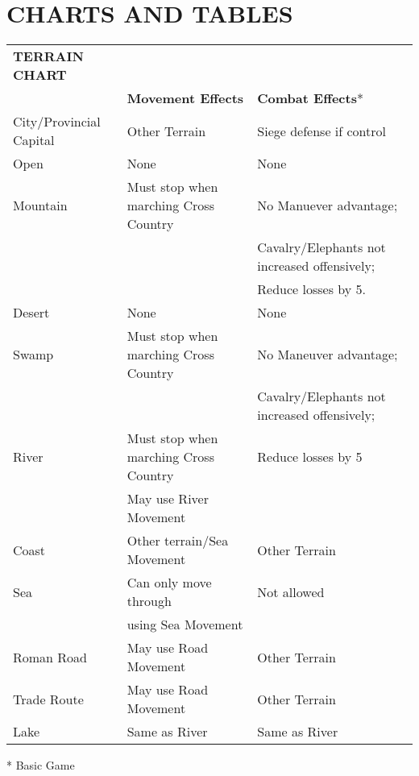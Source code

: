 \section{CHARTS AND TABLES}

\begin{tabular}{|lll|}
  \hline
  \textbf{TERRAIN CHART} & &\\
  & \textbf{Movement Effects} & \textbf{Combat Effects}*\\
  City/Provincial Capital & Other Terrain & Siege defense if control\\
  Open & None & None\\
  Mountain & Must stop when marching Cross Country & No Manuever advantage;\\
  & & Cavalry/Elephants not increased offensively;\\
  & & Reduce losses by 5.\\
  Desert & None & None\\
  Swamp & Must stop when marching Cross Country & No Maneuver advantage;\\
  & & Cavalry/Elephants not increased offensively;\\
  River & Must stop when marching Cross Country & Reduce losses by 5\\
  & May use River Movement &\\
  Coast & Other terrain/Sea Movement & Other Terrain\\
  Sea & Can only move through & Not allowed\\
  & using Sea Movement &\\
  Roman Road & May use Road Movement & Other Terrain\\
  Trade Route & May use Road Movement & Other Terrain\\
  Lake & Same as River & Same as River\\
  \hline
\end{tabular}

* Basic Game